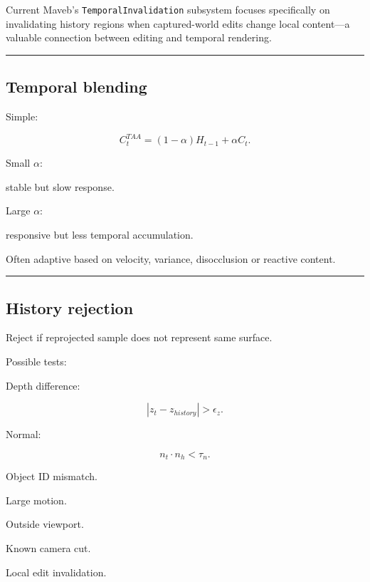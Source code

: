 Current Maveb's \texttt{TemporalInvalidation} subsystem focuses specifically on invalidating history regions when captured-world edits change local content---a valuable connection between editing and temporal rendering.

\begin{center}\rule{0.5\linewidth}{0.5pt}\end{center}

\subsection{Temporal blending}\label{04-visual-computing-ii-ch040-temporal-blending}

\hypertarget{04-visual-computing-ii-ch040-temporal-blending}{}

Simple:

\[
\boxed{
C_t^{TAA}
=
(1-\alpha)
H_{t-1}
+
\alpha
C_t.
}
\]

Small \(\alpha\):

stable but slow response.

Large \(\alpha\):

responsive but less temporal accumulation.

Often adaptive based on velocity, variance, disocclusion or reactive content.

\begin{center}\rule{0.5\linewidth}{0.5pt}\end{center}

\subsection{History rejection}\label{04-visual-computing-ii-ch040-history-rejection}

\hypertarget{04-visual-computing-ii-ch040-history-rejection}{}

Reject if reprojected sample does not represent same surface.

Possible tests:

Depth difference:

\[
|z_t-z_{history}|>\epsilon_z.
\]

Normal:

\[
n_t\cdot n_h<\tau_n.
\]

Object ID mismatch.

Large motion.

Outside viewport.

Known camera cut.

Local edit invalidation.

